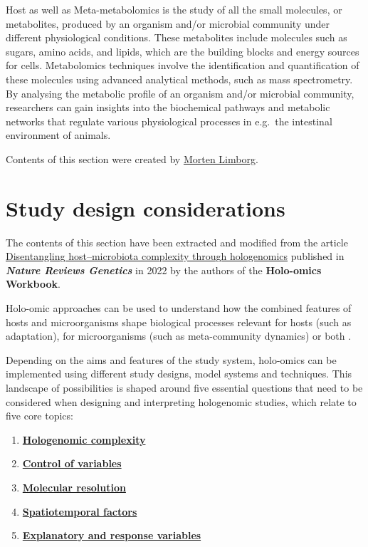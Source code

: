 \documentclass[
]{book}
\providecommand{\tightlist}{%
  \setlength{\itemsep}{0pt}\setlength{\parskip}{0pt}}
\begin{document}
Host as well as Meta-metabolomics is the study of all the small molecules, or metabolites, produced by an organism and/or microbial community under different physiological conditions. These metabolites include molecules such as sugars, amino acids, and lipids, which are the building blocks and energy sources for cells. Metabolomics techniques involve the identification and quantification of these molecules using advanced analytical methods, such as mass spectrometry. By analysing the metabolic profile of an organism and/or microbial community, researchers can gain insights into the biochemical pathways and metabolic networks that regulate various physiological processes in e.g.~the intestinal environment of animals.

Contents of this section were created by \protect\hyperlink{morten-limborg}{Morten Limborg}.

\hypertarget{study-design-considerations}{%
\chapter{Study design considerations}\label{study-design-considerations}}

The contents of this section have been extracted and modified from the article \href{https://www.nature.com/articles/s41576-021-00421-0}{Disentangling host--microbiota complexity through hologenomics} published in \textbf{\emph{Nature Reviews Genetics}} in 2022 by the authors of the \textbf{Holo-omics Workbook}.

Holo-omic approaches can be used to understand how the combined features of hosts and microorganisms shape biological processes relevant for hosts (such as adaptation), for microorganisms (such as meta-community dynamics) or both \citep{Alberdi2022-ay}.

Depending on the aims and features of the study system, holo-omics can be implemented using different study designs, model systems and techniques. This landscape of possibilities is shaped around five essential questions that need to be considered when designing and interpreting hologenomic studies, which relate to five core topics:

\begin{enumerate}
\def\labelenumi{\arabic{enumi}.}
\tightlist
\item
  \textbf{\protect\hyperlink{hologenomic-complexity}{Hologenomic complexity}}
\item
  \textbf{\protect\hyperlink{control-of-variables}{Control of variables}}
\item
  \textbf{\protect\hyperlink{molecular-resolution}{Molecular resolution}}
\item
  \textbf{\protect\hyperlink{spatiotemporal-factors}{Spatiotemporal factors}}
\item
  \textbf{\protect\hyperlink{explanatory-and-response-variables}{Explanatory and response variables}}
\end{enumerate}
\end{document}
